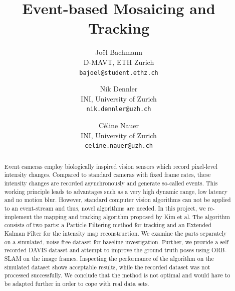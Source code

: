 \documentclass[10pt,twocolumn,letterpaper]{article}
\begin{document}
\title{Event-based Mosaicing and Tracking}

\author{Jo\"el Bachmann\\
D-MAVT, ETH Zurich\\
{\tt\small bajoel@student.ethz.ch}
\and
Nik Dennler\\
INI, University of Zurich\\
{\tt\small nik.dennler@uzh.ch}
\and
C\'eline Nauer\\
INI, University of Zurich\\
{\tt\small celine.nauer@uzh.ch}
}



\maketitle

\begin{abstract}
Event cameras employ biologically inspired vision sensors which record pixel-level intensity changes. Compared to standard cameras with fixed frame rates, these intensity changes are recorded asynchronously and generate so-called events. 
This working principle leads to advantages such as a very high dynamic range, low latency and no motion blur. 
However, standard computer vision algorithms can not be applied to an event-stream and thus, novel algorithms are needed. In this project, we re-implement the mapping and tracking algorithm proposed by Kim et al. 
The algorithm consists of two parts: a Particle Filtering method for tracking and an Extended Kalman Filter for the intensity map reconstruction. We examine the parts separately on a simulated, noise-free dataset for baseline investigation.
Further, we provide a self-recorded DAVIS dataset and attempt to improve the ground truth poses using ORB-SLAM on the image frames. Inspecting the performance of the algorithm on the simulated dataset shows acceptable results, while the recorded dataset was not processed successfully. 
We conclude that the method is not optimal and would have to be adapted further in order to cope with real data sets.
\end{abstract}
\end{document}

